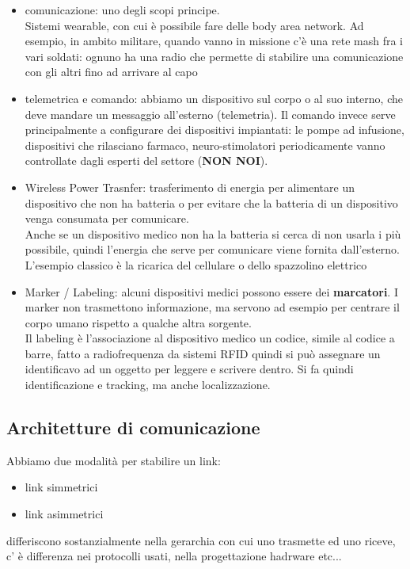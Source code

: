 \documentclass[oneside, 12pt]{extbook}
\begin{document}
\begin{itemize}
	\item comunicazione: uno degli scopi principe.\\Sistemi wearable, con cui è possibile fare delle body area network. Ad esempio, in ambito militare, quando vanno in missione c'è una rete mash fra i vari soldati: ognuno ha una radio che permette di stabilire una comunicazione con gli altri fino ad arrivare al capo
	\item telemetrica e comando: abbiamo un dispositivo sul corpo o al suo interno, che deve mandare un messaggio all'esterno (telemetria). Il comando invece serve principalmente a configurare dei dispositivi impiantati: le pompe ad infusione, dispositivi che rilasciano farmaco, neuro-stimolatori periodicamente vanno controllate dagli esperti del settore (\textbf{\textsf{NON NOI}}).
	\item Wireless Power Trasnfer: trasferimento di energia per alimentare un dispositivo che non ha batteria o per evitare che la batteria di un dispositivo venga consumata per comunicare.\\Anche se un dispositivo medico non ha la batteria si cerca di non usarla i più possibile, quindi l'energia che serve per comunicare viene fornita dall'esterno.\\L'esempio classico è la ricarica del cellulare o dello spazzolino elettrico
	\item Marker / Labeling: alcuni dispositivi medici possono essere dei \textbf{marcatori}. I marker non trasmettono informazione, ma servono ad esempio per centrare il corpo umano rispetto a qualche altra sorgente.\\Il labeling è l'associazione al dispositivo medico un codice, simile al codice a barre, fatto a radiofrequenza da sistemi RFID quindi si può assegnare un identificavo ad un oggetto per leggere e scrivere dentro. Si fa quindi identificazione e tracking, ma anche localizzazione.
\end{itemize}

\subsection{Architetture di comunicazione}
Abbiamo due modalità per stabilire un link:
\begin{itemize}
	\item link simmetrici
	\item link asimmetrici
\end{itemize}
differiscono sostanzialmente nella gerarchia con cui uno trasmette ed uno riceve, c' è differenza nei protocolli usati, nella progettazione hadrware etc...
\end{document}
